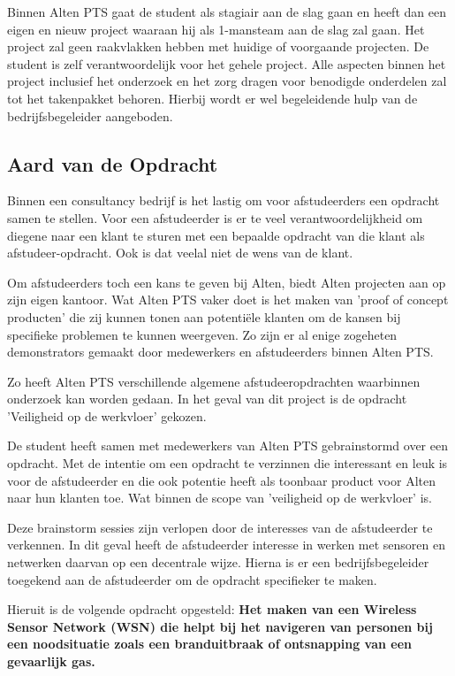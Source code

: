 \documentclass{../local}
\begin{document}
Binnen Alten PTS gaat de student als stagiair aan de slag gaan en heeft dan een eigen en nieuw project waaraan hij als 1-mansteam aan de slag zal gaan. Het project zal geen raakvlakken hebben met huidige of voorgaande projecten. De student is zelf verantwoordelijk voor het gehele project. Alle aspecten binnen het project inclusief het onderzoek en het zorg dragen voor benodigde onderdelen zal tot het takenpakket behoren. Hierbij wordt er wel begeleidende hulp van de bedrijfsbegeleider aangeboden.

\subsection{Aard van de Opdracht}

Binnen een consultancy bedrijf is het lastig om voor afstudeerders een opdracht samen te stellen. Voor een afstudeerder is er te veel verantwoordelijkheid om diegene naar een klant te sturen met een bepaalde opdracht van die klant als afstudeer-opdracht. Ook is dat veelal niet de wens van de klant. 

Om afstudeerders toch een kans te geven bij Alten, biedt Alten projecten aan op zijn eigen kantoor. Wat Alten PTS vaker doet is het maken van 'proof of concept producten' die zij kunnen tonen aan potentiële klanten om de kansen bij specifieke problemen te kunnen weergeven. Zo zijn er al enige zogeheten demonstrators gemaakt door medewerkers en afstudeerders binnen Alten PTS.

Zo heeft Alten PTS verschillende algemene afstudeeropdrachten waarbinnen onderzoek kan worden gedaan. In het geval van dit project is de opdracht 'Veiligheid op de werkvloer' gekozen.

De student heeft samen met medewerkers van Alten PTS gebrainstormd over een opdracht. Met de intentie om een opdracht te verzinnen die interessant en leuk is voor de afstudeerder en die ook potentie heeft als toonbaar product voor Alten naar hun klanten toe. Wat binnen de scope van 'veiligheid op de werkvloer' is.

Deze brainstorm sessies zijn verlopen door de interesses van de afstudeerder te verkennen. In dit geval heeft de afstudeerder interesse in werken met sensoren en netwerken daarvan op een decentrale wijze. Hierna is er een bedrijfsbegeleider toegekend aan de afstudeerder om de opdracht specifieker te maken.


Hieruit is de volgende opdracht opgesteld: 	
\textbf{
Het maken van een Wireless Sensor Network (WSN) die helpt bij het navigeren van personen bij een noodsituatie zoals een branduitbraak of ontsnapping van een gevaarlijk gas.
}
\end{document}
